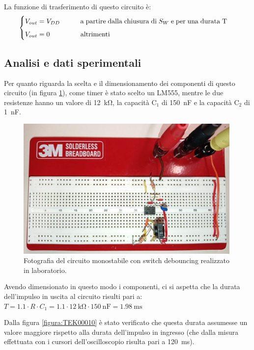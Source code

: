 \documentclass{report}
\begin{document}
La funzione di trasferimento di questo circuito è:
\begin{equation}
	\begin{cases}
		V_{out}= V_{DD}\indent\indent \mathrm{a\;partire\;dalla\;chiusura\;di\;} S_W \mathrm{\;e\;per\;una\;durata\;T\;}\\[5pt]
		V_{out}= 0\indent\indent\indent \mathrm{altrimenti}\\
	\end{cases}
\end{equation}

\subsection{Analisi e dati sperimentali}
Per quanto riguarda la scelta e il dimensionamento dei componenti di questo circuito (in figura \ref{figura:circuito1}), come timer è stato scelto un LM555, mentre le due resistenze hanno un valore di \SI{12}{\kilo\ohm}, la capacità $\mathrm{C_1}$ di \SI{150}{\nano\farad} e la capacità $\mathrm{C_2}$ di \SI{1}{\nano\farad}.

\begin{figure}[h!]
	\centering
	\includegraphics[height=7cm]{immagini/circuito1}
	\caption{Fotografia del circuito monostabile con switch debouncing realizzato in laboratorio.}
	\label{figura:circuito1}
\end{figure}

\noindent Avendo dimensionato in questo modo i componenti, ci si aspetta che la durata dell'impulso in uscita al circuito risulti pari a: \indent$\displaystyle{T = 1.1 \cdot R \cdot C_1 = 1.1 \cdot \SI{12}{\kilo\ohm} \cdot \SI{150}{\nano\farad} = \SI{1.98}{\milli\second}}$

Dalla figura \ref{figura:TEK00010} è stato verificato che questa durata assumesse un valore maggiore rispetto alla durata dell'impulso in ingresso (che dalla misura effettuata con i cursori dell'oscilloscopio risulta pari a \SI{120}{\milli\second}).
\end{document}

